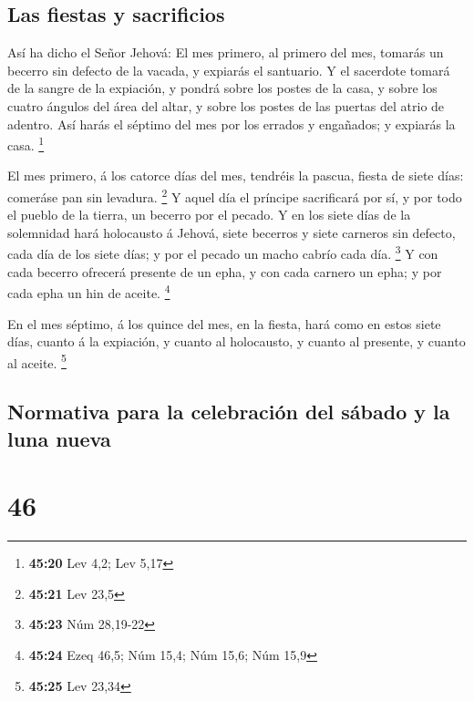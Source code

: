 \hypertarget{las-fiestas-y-sacrificios}{%
\subsection{Las fiestas y sacrificios}\label{las-fiestas-y-sacrificios}}

 Así ha dicho el Señor Jehová: El mes primero, al primero
del mes, tomarás un becerro sin defecto de la vacada, y expiarás el
santuario.  Y el sacerdote tomará de la sangre de la
expiación, y pondrá sobre los postes de la casa, y sobre los cuatro
ángulos del área del altar, y sobre los postes de las puertas del atrio
de adentro.  Así harás el séptimo del mes por los errados y
engañados; y expiarás la casa. \footnote{\textbf{45:20} Lev 4,2; Lev
  5,17}

 El mes primero, á los catorce días del mes, tendréis la
pascua, fiesta de siete días: comeráse pan sin levadura. \footnote{\textbf{45:21}
  Lev 23,5}  Y aquel día el príncipe sacrificará por sí, y
por todo el pueblo de la tierra, un becerro por el pecado. 
Y en los siete días de la solemnidad hará holocausto á Jehová, siete
becerros y siete carneros sin defecto, cada día de los siete días; y por
el pecado un macho cabrío cada día. \footnote{\textbf{45:23} Núm
  28,19-22}  Y con cada becerro ofrecerá presente de un
epha, y con cada carnero un epha; y por cada epha un hin de aceite.
\footnote{\textbf{45:24} Ezeq 46,5; Núm 15,4; Núm 15,6; Núm 15,9}

 En el mes séptimo, á los quince del mes, en la fiesta,
hará como en estos siete días, cuanto á la expiación, y cuanto al
holocausto, y cuanto al presente, y cuanto al aceite. \footnote{\textbf{45:25}
  Lev 23,34}

\hypertarget{normativa-para-la-celebraciuxf3n-del-suxe1bado-y-la-luna-nueva}{%
\subsection{Normativa para la celebración del sábado y la luna
nueva}\label{normativa-para-la-celebraciuxf3n-del-suxe1bado-y-la-luna-nueva}}

\hypertarget{section-45}{%
\section{46}\label{section-45}}

